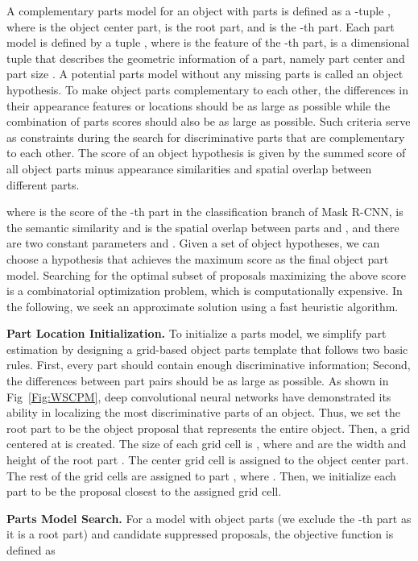 \documentclass[10pt,twocolumn,letterpaper]{article}
\begin{document}
A complementary parts model for an object with  parts is defined as a -tuple , where  is the object center part,  is the root part, and  is the -th part. Each part model is defined by a tuple , where  is the feature of the -th part,  is a  dimensional tuple that describes the geometric information of a part, namely part center and part size . A potential parts model without any missing parts is called an object hypothesis. To make object parts complementary to each other, the differences in their appearance features or locations should be as large as possible while the combination of parts scores should also be as large as possible. Such criteria serve as constraints during the search for discriminative parts that are complementary to each other. The score  of an object hypothesis is given by the summed score of all object parts minus appearance similarities and spatial overlap between different parts.
    
where  is the score of the -th part in the classification branch of Mask R-CNN,  is the semantic similarity and  is the spatial overlap between parts  and , and there are two constant parameters  and . Given a set of object hypotheses, we can choose a hypothesis that achieves the maximum score as the final object part model. Searching for the optimal subset of proposals maximizing the above score is a combinatorial optimization problem, which is computationally expensive. In the following, we seek an approximate solution using a fast heuristic algorithm.

\noindent\textbf{Part Location Initialization.} To initialize a parts model, we simplify part estimation by designing a grid-based object parts template that follows two basic rules. First, every part should contain enough discriminative information; Second, the differences between part pairs should be as large as possible. As shown in Fig~\ref{Fig:WSCPM}, deep convolutional neural networks have demonstrated its ability in localizing the most discriminative parts of an object. Thus, we set the root part  to be the object proposal  that represents the entire object. Then, a  grid centered at  is created. The size of each grid cell is , where  and  are the width and height of the root part . The center grid cell is assigned to the object center part. The rest of the grid cells are assigned to part , where . Then, we initialize each part  to be the proposal  closest to the assigned grid cell.

\noindent\textbf{Parts Model Search.} For a model with  object parts (we exclude the -th part as it is a root part) and  candidate suppressed proposals, the objective function is defined as
    
\end{document}
